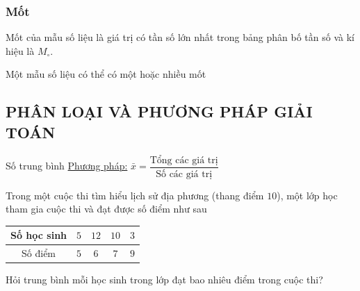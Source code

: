 \subsubsection{Mốt}
\begin{boxdn}
	Mốt của mẫu số liệu là giá trị có tần số lớn nhất trong bảng phân bố tần số và kí hiệu là $M_\circ$.
\end{boxdn}
\begin{note}
	Một mẫu số liệu có thể có một hoặc nhiều mốt
\end{note}

\subsection{PHÂN LOẠI VÀ PHƯƠNG PHÁP GIẢI TOÁN}

\begin{dang}{Số trung bình}
	\underline{Phương pháp:} $\bar{x} = \dfrac{\text{Tổng các giá trị}}{\text{Số các giá trị}}$
\end{dang}
\begin{vd}%
	Trong một cuộc thi tìm hiểu lịch sử địa phương (thang điểm $10$), một lớp học tham gia cuộc thi và đạt được số điểm như sau
	\begin{center}
		\begin{tabular}{|c|c|c|c|c|}
			\hline
			Số học sinh & $5$ & $12$ & $10$ & $3$\\
			\hline
			Số điểm & $5$ & $6$ & $7$ & $9$\\
			\hline
		\end{tabular}
	\end{center}
	Hỏi trung bình mỗi học sinh trong lớp đạt bao nhiêu điểm trong cuộc thi?
\end{vd}

